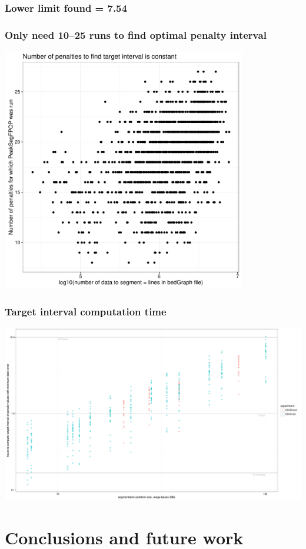 \documentclass{beamer}
\begin{document}
\begin{frame}
  \frametitle{Lower limit found = 7.54}
\end{frame}

\begin{frame}
  \frametitle{Only need 10--25 runs to find optimal penalty interval}
  \includegraphics[width=0.8\textwidth]{figure-timing-data-penalties}
\end{frame}

\begin{frame}
  \frametitle{Target interval computation time}
  \includegraphics[width=\textwidth]{figure-target-interval-time}
\end{frame}

\section{Conclusions and future work}
\end{document}
